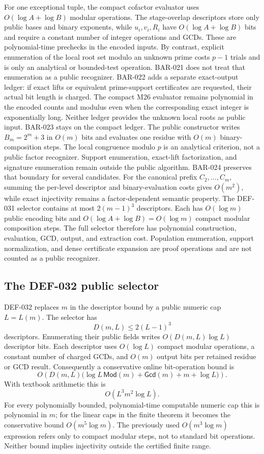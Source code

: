 \documentclass[11pt]{article}
\begin{document}
For one exceptional tuple, the compact cofactor evaluator uses
\(O(\log A+\log B)\) modular operations. The stage-overlap descriptors store
only public bases and binary exponents, while \(u_i,v_i,R_i\) have
\(O(\log A+\log B)\) bits and require a constant number of integer
operations and GCDs. These are polynomial-time prechecks in the encoded
inputs. By contrast, explicit enumeration of the local root set modulo an
unknown prime costs \(p-1\) trials and is only an analytical or bounded-test
operation. BAR-021 does not treat that enumeration as a public recognizer.
BAR-022 adds a separate exact-output ledger: if exact lifts or equivalent
prime-support certificates are requested, their actual bit length is charged.
The compact M26 evaluator remains polynomial in the encoded counts and
modulus even when the corresponding exact integer is exponentially long.
Neither ledger provides the unknown local roots as public input.
BAR-023 stays on the compact ledger. The public constructor writes
\(B_m=2^m+3\) in \(O(m)\) bits and evaluates one residue with \(O(m)\)
binary-composition steps. The local congruence modulo \(p\) is an analytical
criterion, not a public factor recognizer. Support enumeration, exact-lift
factorization, and signature enumeration remain outside the public
algorithm. BAR-024 preserves that boundary for several candidates. For the
canonical prefix \(C_2,\ldots,C_m\), summing the per-level descriptor and
binary-evaluation costs gives \(O(m^2)\), while exact injectivity remains a
factor-dependent semantic property.
The DEF-031 selector contains at most \(2(m-1)^3\) descriptors. Each has
\(O(\log m)\) public encoding bits and
\(O(\log A+\log B)=O(\log m)\) compact modular composition steps. The full
selector therefore has polynomial construction, evaluation, GCD, output, and
extraction cost. Population enumeration, support normalization, and dense
certificate expansion are proof operations and are not counted as a public
recognizer.
\subsection{The DEF-032 public selector}

DEF-032 replaces \(m\) in the descriptor bound by a public numeric cap
\(L=L(m)\). The selector has
\[
D(m,L)\le2(L-1)^3
\]
descriptors. Enumerating their public fields writes
\(O(D(m,L)\log L)\) descriptor bits. Each descriptor uses
\(O(\log L)\) compact modular operations, a constant number of charged GCDs,
and \(O(m)\) output bits per retained residue or GCD result. Consequently a
conservative online bit-operation bound is
\[
O\!\left(
 D(m,L)\bigl(
   \log L\,\mathsf{Mod}(m)
   +\mathsf{Gcd}(m)
   +m+\log L
 \bigr)
\right).
\]
With textbook arithmetic this is
\[
O\!\left(L^3m^2\log L\right).
\]
For every polynomially bounded, polynomial-time computable numeric cap this
is polynomial in \(m\); for the linear caps in the finite theorem it becomes
the conservative bound \(O(m^5\log m)\). The previously used
\(O(m^3\log m)\) expression refers only to compact modular steps, not to
standard bit operations. Neither bound implies injectivity outside the
certified finite range.
\end{document}
